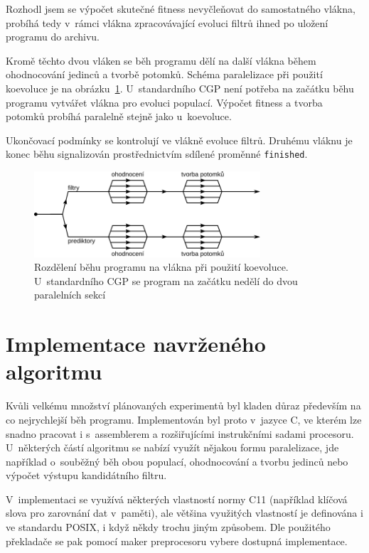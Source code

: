 Rozhodl jsem se výpočet skutečné fitness nevyčleňovat do samostatného vlákna, probíhá tedy v~rámci vlákna zpracovávající evoluci filtrů ihned po uložení programu do archivu.

Kromě těchto dvou vláken se běh programu dělí na další vlákna během ohodnocování jedinců a tvorbě potomků. Schéma paralelizace při použití koevoluce je na obrázku~\ref{obrParalelizace}. U~standardního CGP není potřeba na začátku běhu programu vytvářet vlákna pro evoluci populací. Výpočet fitness a tvorba potomků probíhá paralelně stejně jako u~koevoluce.

Ukončovací podmínky se kontrolují ve vlákně evoluce filtrů. Druhému vláknu je konec běhu signalizován prostřednictvím sdílené proměnné \texttt{finished}.

\begin{figure}[htb]
    \centering
    \includegraphics[width=0.75\textwidth]{fig/openmp}
    \caption{Rozdělení běhu programu na vlákna při použití koevoluce. U~standardního CGP se program na začátku nedělí do dvou paralelních sekcí}
    \label{obrParalelizace}
\end{figure}


\chapter{Implementace navrženého algoritmu}
\label{chImplementation}

Kvůli velkému množství plánovaných experimentů byl kladen důraz především na co nejrychlejší běh programu. Implementován byl proto v~jazyce C, ve kterém lze snadno pracovat i s~assemblerem a rozšiřujícími instrukčními sadami procesoru. U~některých částí algoritmu se nabízí využít nějakou formu paralelizace, jde například o~souběžný běh obou populací, ohodnocování a tvorbu jedinců nebo výpočet výstupu kandidátního filtru.

V~implementaci se využívá některých vlastností normy C11 (například klíčová slova pro zarovnání dat v~paměti), ale většina využitých vlastností je definována i ve standardu POSIX, i když někdy trochu jiným způsobem. Dle použitého překladače se pak pomocí maker preprocesoru vybere dostupná implementace.

